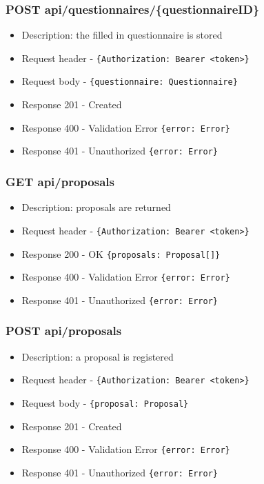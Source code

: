 \subsubsection{POST api/questionnaires/\{questionnaireID\}}
\begin{itemize}
    \item Description: the filled in questionnaire is stored
    \item Request header - \verb|{Authorization: Bearer <token>}|
    \item Request body - \verb|{questionnaire: Questionnaire}|
    \item Response 201 - Created
    \item Response 400 - Validation Error \verb|{error: Error}|
    \item Response 401 - Unauthorized \verb|{error: Error}|
\end{itemize}

\subsubsection{GET api/proposals}
\begin{itemize}
    \item Description: proposals are returned
    \item Request header - \verb|{Authorization: Bearer <token>}|
    \item Response 200 - OK \verb|{proposals: Proposal[]}|
    \item Response 400 - Validation Error \verb|{error: Error}|
    \item Response 401 - Unauthorized \verb|{error: Error}|
\end{itemize}

\subsubsection{POST api/proposals}
\begin{itemize}
    \item Description: a proposal is registered
    \item Request header - \verb|{Authorization: Bearer <token>}|
    \item Request body - \verb|{proposal: Proposal}|
    \item Response 201 - Created
    \item Response 400 - Validation Error \verb|{error: Error}|
    \item Response 401 - Unauthorized \verb|{error: Error}|
\end{itemize}

